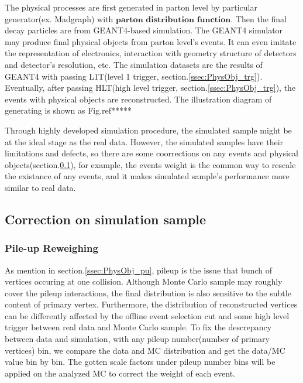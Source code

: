		The physical processes are first generated in parton level by particular generator(ex. Madgraph) with $\textbf{parton distribution function}$. Then the final decay particles are from GEANT4-based\cite{Agostinelli:2002hh} simulation. The GEANT4 simulator may produce final physical objects from parton level's events. It can even imitate the representation of electronics, interaction with geometry structure of detectors and detector's resolution, etc. The simulation datasets are the results of GEANT4 with passing L1T(level 1 trigger, section.\ref{ssec:PhysObj_trg}). Eventually, after passing HLT(high level trigger, section.\ref{ssec:PhysObj_trg}), the events with physical objects are reconstructed. The illustration diagram of generating is shown as Fig.ref*****

		Through highly developed simulation procedure, the simulated sample might be at the ideal stage as the real data. However, the simulated samples have their limitations and defects, so there are some coorrections on any events and physical objects(section.\ref{ssec:DataAndMC_corMC}), for example, the events weight is the common way to rescale the existance of any events, and it makes simulated sample's performance more similar to real data.



	\subsection{Correction on simulation sample}
	\label{ssec:DataAndMC_corMC}

		\subsubsection{Pile-up Reweighing}
		\label{sssec:DataAndMC_PU}


			As mention in section.\ref{ssec:PhysObj_pu}, pileup is the issue that bunch of vertices occuring at one collision. Although Monte Carlo sample may roughly cover the pileup interactions, the final distribution is also sensitive to the subtle content of primary vertex. Furthermore, the distribution of reconstructed vertices can be differently affected by the offline event selection cut and some high level trigger between real data and Monte Carlo sample. To fix the descrepancy between data and simulation, with any pileup number(number of primary vertices) bin, we compare the data and MC distribution and get the data/MC value bin by bin. The gotten scale factors under pileup number bins will be applied on the analyzed MC to correct the weight of each event.

